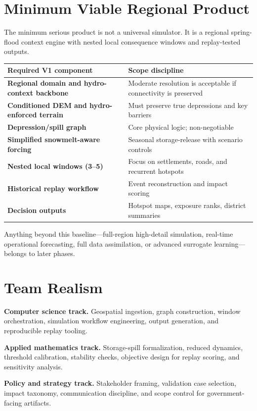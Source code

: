 \documentclass[11pt]{article}
\begin{document}
\section{Minimum Viable Regional Product}

The minimum serious product is not a universal simulator. It is a regional spring-flood context engine with nested local consequence windows and replay-tested outputs.

\begin{tabularx}{\textwidth}{@{}>{\bfseries}p{}Y@{}}
\toprule
Required V1 component & Scope discipline \\
\midrule
Regional domain and hydro-context backbone & Moderate resolution is acceptable if connectivity is preserved \\
Conditioned DEM and hydro-enforced terrain & Must preserve true depressions and key barriers \\
Depression/spill graph & Core physical logic; non-negotiable \\
Simplified snowmelt-aware forcing & Seasonal storage-release with scenario controls \\
Nested local windows (3--5) & Focus on settlements, roads, and recurrent hotspots \\
Historical replay workflow & Event reconstruction and impact scoring \\
Decision outputs & Hotspot maps, exposure ranks, district summaries \\
\bottomrule
\end{tabularx}

Anything beyond this baseline---full-region high-detail simulation, real-time operational forecasting, full data assimilation, or advanced surrogate learning---belongs to later phases.

\section{Team Realism}

\textbf{Computer science track.} Geospatial ingestion, graph construction, window orchestration, simulation workflow engineering, output generation, and reproducible replay tooling.

\textbf{Applied mathematics track.} Storage-spill formalization, reduced dynamics, threshold calibration, stability checks, objective design for replay scoring, and sensitivity analysis.

\textbf{Policy and strategy track.} Stakeholder framing, validation case selection, impact taxonomy, communication discipline, and scope control for government-facing artifacts.
\end{document}
